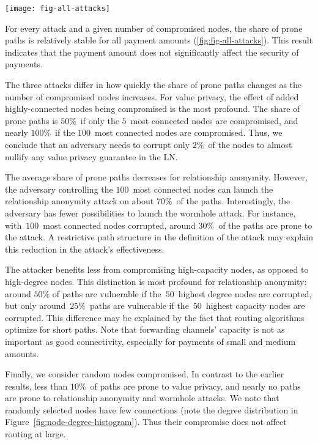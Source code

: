\begin{figure*}
	\centering
	\texttt{[image: fig-all-attacks]}
	\caption{Share of prone paths for each parameter combination.}
	\label{fig:fig-all-attacks}
\end{figure*}

For every attack and a given number of compromised nodes, the share of prone paths is relatively stable for all payment amounts (\cref{fig:fig-all-attacks}).
This result indicates that the payment amount does not significantly affect the security of payments.

The three attacks differ in how quickly the share of prone paths changes as the number of compromised nodes increases.
For value privacy, the effect of added highly-connected nodes being compromised is the most profound.
The share of prone paths is $50\%$~if only the $5$~most connected nodes are compromised, and nearly $100\%$~if the $100$~most connected nodes are compromised.
Thus, we conclude that an adversary needs to corrupt only $2\%$~of the nodes to almost nullify any value privacy guarantee in the LN\@.

The average share of prone paths decreases for relationship anonymity.
However, the adversary controlling the $100$~most connected nodes can launch the relationship anonymity attack on about $70\%$~of the paths.
Interestingly, the adversary has fewer possibilities to launch the wormhole attack.
For instance, with~$100$~most connected nodes corrupted, around $30\%$~of the paths are prone to the attack.
A restrictive path structure in the definition of the attack may explain this reduction in the attack's effectiveness.

The attacker benefits less from compromising high-capacity nodes, as opposed to high-degree nodes.
This distinction is most profound for relationship anonymity: around $50\%$ of paths are vulnerable if the~$50$~highest degree nodes are corrupted, but only around~$25\%$~paths are vulnerable if the~$50$~highest capacity nodes are corrupted.
This difference may be explained by the fact that routing algorithms optimize for short paths.
Note that forwarding channels' capacity is not as important as good connectivity, especially for payments of small and medium amounts.

Finally, we consider random nodes compromised.
In contrast to the earlier results, less than $10\%$~of paths are prone to value privacy, and nearly no paths are prone to relationship anonymity and wormhole attacks.
We note that randomly selected nodes have few connections (note the degree distribution in Figure~\ref{fig:node-degree-histogram}).
Thus their compromise does not affect routing at large.

